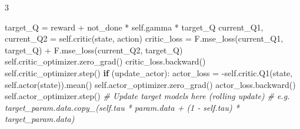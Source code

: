 \documentclass{article}
\newenvironment{Shaded}{\CodeFontSize\setlength{\topsep}{\CodeBlockSkip}\setlength{\partopsep}{0pt}}{}
\newcommand{\CommentTok}[1]{\textcolor[rgb]{0.38,0.63,0.69}{\textit{#1}}}
\newcommand{\ControlFlowTok}[1]{\textcolor[rgb]{0.00,0.44,0.13}{\textbf{#1}}}
\newcommand{\NormalTok}[1]{#1}
\newcommand{\OperatorTok}[1]{\textcolor[rgb]{0.40,0.40,0.40}{#1}}
\newcommand{\VariableTok}[1]{\textcolor[rgb]{0.10,0.09,0.49}{#1}}
\newcommand{\CodeFontSize}{\fontsize{4.8}{5.6}\selectfont}
\newcommand{\NumColumns}{3}  %
\newlength{\CodeBlockSkip}
\begin{document}
\begin{multicols*}{\NumColumns}
\begin{Shaded}
\begin{Highlighting}[]
\NormalTok{  target\_Q }\OperatorTok{=}\NormalTok{ reward }\OperatorTok{+}\NormalTok{ not\_done }\OperatorTok{*} \VariableTok{self}\NormalTok{.gamma }\OperatorTok{*}\NormalTok{ target\_Q}
\NormalTok{current\_Q1, current\_Q2 }\OperatorTok{=} \VariableTok{self}\NormalTok{.critic(state, action)}
\NormalTok{critic\_loss }\OperatorTok{=}\NormalTok{ F.mse\_loss(current\_Q1, target\_Q) }\OperatorTok{+}\NormalTok{ F.mse\_loss(current\_Q2, target\_Q)}
\VariableTok{self}\NormalTok{.critic\_optimizer.zero\_grad()}
\NormalTok{critic\_loss.backward()}
\VariableTok{self}\NormalTok{.critic\_optimizer.step()}
\ControlFlowTok{if}\NormalTok{ (update\_actor):}
\NormalTok{  actor\_loss }\OperatorTok{=} \OperatorTok{{-}}\VariableTok{self}\NormalTok{.critic.Q1(state, }\VariableTok{self}\NormalTok{.actor(state)).mean()}
  \VariableTok{self}\NormalTok{.actor\_optimizer.zero\_grad()}
\NormalTok{  actor\_loss.backward()}
  \VariableTok{self}\NormalTok{.actor\_optimizer.step()}
  \CommentTok{\# Update target models here (rolling update)}
  \CommentTok{\# e.g. target\_param.data.copy\_(self.tau * param.data + (1 {-} self.tau) * target\_param.data)}
\end{Highlighting}
\end{Shaded}


\end{multicols*}
\end{document}
